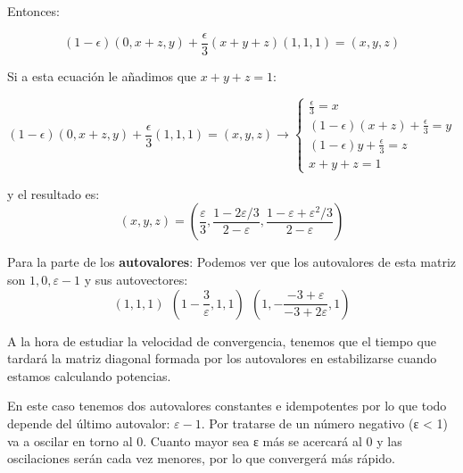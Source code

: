 \begin{problem}[8]
	Entonces:

	$$ (1-\epsilon)(0,x+z,y) + \frac{\epsilon}{3} (x + y + z) (1,1,1) = (x,y,z) $$

	Si a esta ecuación le añadimos que $ x + y + z = 1$:

	$$(1-\epsilon)(0,x+z,y) + \frac{\epsilon}{3} (1,1,1) = (x,y,z) \rightarrow \begin{cases}
	\frac{\epsilon}{3}= x\\
	(1-\epsilon)(x+z) + \frac{\epsilon}{3}=y\\
	(1-\epsilon) y + \frac{\epsilon}{3} = z\\
	x + y +z = 1
	\end{cases}$$

	y el resultado es:
	$$(x,y,z) = \left(\frac{ε}{3}, \frac{1-2ε/3}{2-ε}, \frac{1-ε+ε^2/3}{2-ε}\right)$$

	Para la parte de los \textbf{autovalores}:
	Podemos ver que los autovalores de esta matriz son $1,0,ε-1$ y sus autovectores:
	\[(1,1,1) \ \ \left( 1-\frac{3}{ε},1,1\right) \ \ \left(1,-\frac{-3+ε}{-3+2ε},1 \right)\]

	A la hora de estudiar la velocidad de convergencia, tenemos que el tiempo que tardará la matriz diagonal formada por los autovalores en estabilizarse cuando estamos calculando potencias.

	En este caso tenemos dos autovalores constantes e idempotentes por lo que todo depende del último autovalor: $ε-1$. Por tratarse de un número negativo (ε < 1) va a oscilar en torno al 0. Cuanto mayor sea ε más se acercará al 0 y las oscilaciones serán cada vez menores, por lo que convergerá más rápido.
\end{problem}

